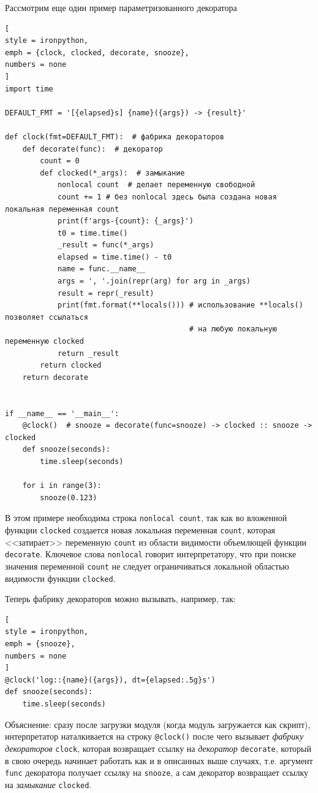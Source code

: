 \documentclass[%
	11pt,
	a4paper,
	utf8,
		]{article}
\begin{document}
Рассмотрим еще один пример параметризованного декоратора

\begin{lstlisting}[
style = ironpython,
emph = {clock, clocked, decorate, snooze},
numbers = none
]
import time

DEFAULT_FMT = '[{elapsed}s] {name}({args}) -> {result}'

def clock(fmt=DEFAULT_FMT):  # фабрика декораторов
    def decorate(func):  # декоратор
        count = 0
        def clocked(*_args):  # замыкание
            nonlocal count  # делает переменную свободной
            count += 1 # без nonlocal здесь была создана новая локальная переменная count
            print(f'args-{count}: {_args}')
            t0 = time.time()
            _result = func(*_args)
            elapsed = time.time() - t0
            name = func.__name__
            args = ', '.join(repr(arg) for arg in _args)
            result = repr(_result)
            print(fmt.format(**locals())) # использование **locals() позволяет ссылаться
                                          # на любую локальную переменную clocked
            return _result
        return clocked
    return decorate


if __name__ == '__main__':
    @clock()  # snooze = decorate(func=snooze) -> clocked :: snooze -> clocked
    def snooze(seconds):
        time.sleep(seconds)

    for i in range(3):
        snooze(0.123)
\end{lstlisting}

В этом примере необходима строка \texttt{nonlocal count}, так как во вложенной функции \texttt{clocked} создается новая локальная переменная \texttt{count}, которая <<затирает>> переменную \texttt{count} из области видимости объемлющей функции \texttt{decorate}. Ключевое слова \texttt{nonlocal} говорит интерпретатору, что при поиске значения переменной \texttt{count} не следует ограничиваться локальной областью видимости функции \texttt{clocked}.

Теперь фабрику декораторов можно вызывать, например, так:
\begin{lstlisting}[
style = ironpython,
emph = {snooze},
numbers = none
]
@clock('log::{name}({args}), dt={elapsed:.5g}s')
def snooze(seconds):
    time.sleep(seconds)
\end{lstlisting}

Объяснение: сразу после загрузки модуля (когда модуль загружается как скрипт), интерпретатор наталкивается на строку \texttt{@clock()} после чего вызывает \emph{фабрику декораторов} \texttt{clock}, которая возвращает ссылку на \emph{декоратор} \texttt{decorate}, который в свою очередь начинает работать как и в описанных выше случаях, т.е. аргумент \texttt{func} декоратора получает ссылку на \texttt{snooze}, а сам декоратор возвращает ссылку на \emph{замыкание} \texttt{clocked}.
\end{document}
